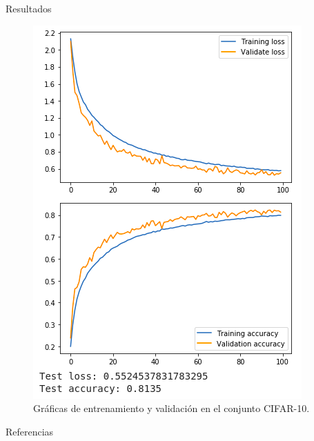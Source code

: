 \documentclass[spanish]{beamer}
\begin{document}
\begin{frame}{Resultados}
\begin{figure}[h]
  \centering
  \includegraphics[width=.5\textwidth]{img/graficascifar}
  \caption{Gráficas de entrenamiento y validación en el conjunto CIFAR-10.}
  \label{fig:cifar-result}
\end{figure}
\end{frame}

\begin{frame}[t,allowframebreaks]{Referencias}
  \printbibliography[heading=none]
\end{frame}
\end{document}
